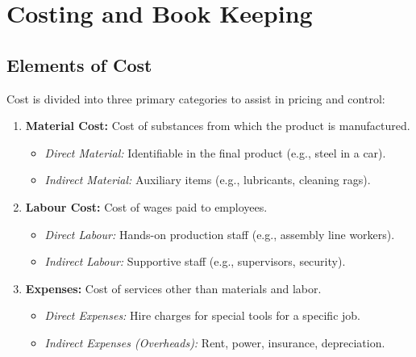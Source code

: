 \documentclass[12pt,a4paper]{article}
\begin{document}
\section{Costing and Book Keeping}

\subsection{Elements of Cost}
Cost is divided into three primary categories to assist in pricing and control:
\begin{enumerate}[label=\textbf{\arabic*.}, leftmargin=*, itemsep=3pt]
  \item \textbf{Material Cost:} Cost of substances from which the product is manufactured.
    \begin{itemize}[label=\tiny$\bullet$, leftmargin=1.5em, itemsep=1.5pt]
      \item \textit{Direct Material:} Identifiable in the final product (e.g., steel in a car).
      \item \textit{Indirect Material:} Auxiliary items (e.g., lubricants, cleaning rags).
    \end{itemize}
  \item \textbf{Labour Cost:} Cost of wages paid to employees.
    \begin{itemize}[label=\tiny$\bullet$, leftmargin=1.5em, itemsep=1.5pt]
      \item \textit{Direct Labour:} Hands-on production staff (e.g., assembly line workers).
      \item \textit{Indirect Labour:} Supportive staff (e.g., supervisors, security).
    \end{itemize}
  \item \textbf{Expenses:} Cost of services other than materials and labor.
    \begin{itemize}[label=\tiny$\bullet$, leftmargin=1.5em, itemsep=1.5pt]
      \item \textit{Direct Expenses:} Hire charges for special tools for a specific job.
      \item \textit{Indirect Expenses (Overheads):} Rent, power, insurance, depreciation.
    \end{itemize}
\end{enumerate}
\end{document}

